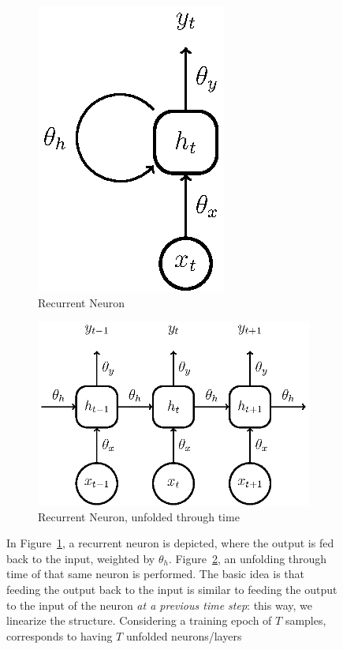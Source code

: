\begin{figure}[H]
	\begin{subfigure}{0.5\linewidth}
		\centering
		\includegraphics[width=0.34\linewidth]{figures/recneuron.eps}
		\caption{Recurrent Neuron}
		\label{fig:recneuron}
	\end{subfigure}
	\begin{subfigure}{0.5\linewidth}
		\centering
		\includegraphics[width=0.9\linewidth]{figures/recneuron_unf.eps}
		\caption{Recurrent Neuron, unfolded through time}
		\label{fig:recneuron_unf}
	\end{subfigure}
		
    \caption[Representation of a Recurrent Neuron (Figure~\ref{fig:recneuron}) and a Recurrent Neuron unfolded through time (Figure~\ref{recneuron_unf})]{In Figure~\ref{fig:recneuron}, a recurrent neuron is depicted, where the output is fed back to the input, weighted by $\theta_h$. Figure~\ref{fig:recneuron_unf}, an unfolding through time of that same neuron is performed. The basic idea is that feeding the output back to the input is similar to feeding the output to the input of the neuron \emph{at a previous time step}: this way, we linearize the structure. Considering a training epoch of $T$ samples, corresponds to having $T$ unfolded neurons/layers}
	\label{fig:recurrneuron}
\end{figure}

